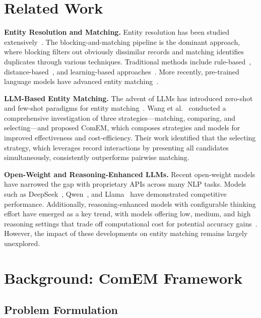 \documentclass[runningheads]{llncs}
\begin{document}
\section{Related Work}

\textbf{Entity Resolution and Matching.}
Entity resolution has been studied extensively~\cite{fellegi1969theory,getoor2012entity,papadakis2021blocking,binette2022almost}. The blocking-and-matching pipeline is the dominant approach, where blocking filters out obviously dissimilar records and matching identifies duplicates through various techniques. Traditional methods include rule-based~\cite{benjelloun2009swoosh}, distance-based~\cite{bilenko2003adaptive}, and learning-based approaches~\cite{li2015rule,mudgal2018deep,barlaug2021neural}. More recently, pre-trained language models have advanced entity matching~\cite{li2020deep,tu2023unicorn}.

\noindent\textbf{LLM-Based Entity Matching.}
The advent of LLMs has introduced zero-shot and few-shot paradigms for entity matching~\cite{narayan2022can,peeters2023using,fan2024cost,li2024leveraging,peeters2025entity}. Wang et al.~\cite{wang2025match} conducted a comprehensive investigation of three strategies---matching, comparing, and selecting---and proposed ComEM, which composes strategies and models for improved effectiveness and cost-efficiency. Their work identified that the selecting strategy, which leverages record interactions by presenting all candidates simultaneously, consistently outperforms pairwise matching.

\noindent\textbf{Open-Weight and Reasoning-Enhanced LLMs.}
Recent open-weight models have narrowed the gap with proprietary APIs across many NLP tasks. Models such as DeepSeek~\cite{deepseek2025r1}, Qwen~\cite{qwen2025technical}, and Llama~\cite{dubey2024llama} have demonstrated competitive performance. Additionally, reasoning-enhanced models with configurable thinking effort have emerged as a key trend, with models offering low, medium, and high reasoning settings that trade off computational cost for potential accuracy gains~\cite{fu2025scaling}. However, the impact of these developments on entity matching remains largely unexplored.

\section{Background: ComEM Framework}

\subsection{Problem Formulation}
\end{document}

